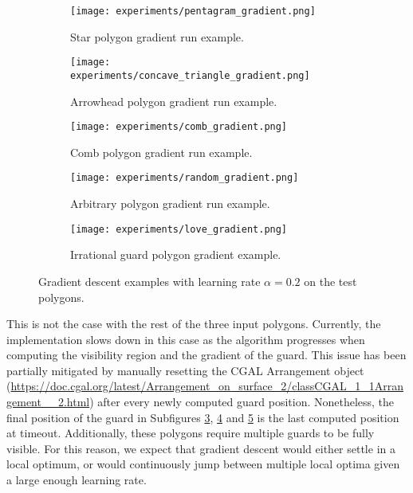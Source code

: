 \begin{figure}[h!]
    \centering
    \begin{subfigure}{0.45\textwidth}
        \centering
        \texttt{[image: experiments/pentagram\_gradient.png]}
        \caption{Star polygon gradient run example.}
        \label{fig:star_gradient}
    \end{subfigure}
    \begin{subfigure}{0.45\textwidth}
        \centering
        \texttt{[image: experiments/concave\_triangle\_gradient.png]}
        \caption{Arrowhead polygon gradient run example.}
        \label{fig:concave_gradient}
    \end{subfigure}
    \begin{subfigure}{0.45\textwidth}
        \centering
        \texttt{[image: experiments/comb\_gradient.png]}
        \caption{Comb polygon gradient run example.}
        \label{fig:comb_gradient}
    \end{subfigure}
    \begin{subfigure}{0.45\textwidth}
        \centering
        \texttt{[image: experiments/random\_gradient.png]}
        \caption{Arbitrary polygon gradient run example.}
        \label{fig:random_gradient}
    \end{subfigure}
    \begin{subfigure}{\textwidth}
        \centering
        \texttt{[image: experiments/love\_gradient.png]}
        \caption{Irrational guard polygon gradient example.}
        \label{fig:love_gradient}
    \end{subfigure}
    \caption{Gradient descent examples with learning rate $\alpha = 0.2$ on the test polygons.}
    \label{fig:gradients}
\end{figure}

This is not the case with the rest of the three input polygons. Currently, the implementation slows down in this case as the algorithm progresses when computing the visibility region and the gradient of the guard. This issue has been partially mitigated by manually resetting the CGAL Arrangement object (\url{https://doc.cgal.org/latest/Arrangement_on_surface_2/classCGAL_1_1Arrangement__2.html}) after every newly computed guard position. Nonetheless, the final position of the guard in Subfigures \ref{fig:comb_gradient}, \ref{fig:random_gradient} and \ref{fig:love_gradient} is the last computed position at timeout. Additionally, these polygons require multiple guards to be fully visible. For this reason, we expect that gradient descent would either settle in a local optimum, or would continuously jump between multiple local optima given a large enough learning rate.

